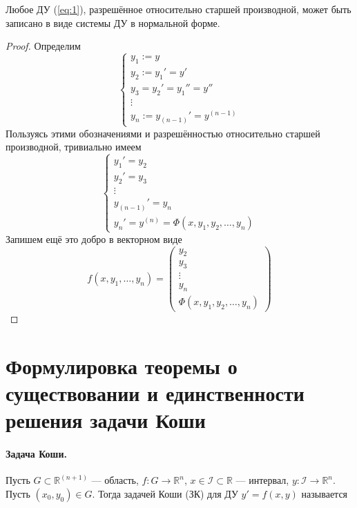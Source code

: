 \documentclass[11pt]{article}
\begin{document}
\begin{remark}
    Любое ДУ (\ref{eq:1}), разрешённое относительно старшей производной, может быть записано в виде системы ДУ в нормальной форме.
\end{remark}

\begin{proof}
    Определим
    \begin{equation*}
        \begin{cases}
            y_1 := y \\
            y_2 := y_1' = y' \\
            y_3 = y_2' = y_1'' = y'' \\
            \vdots \\
            y_n := y_{(n- 1)}' = y^{(n - 1)}
        \end{cases}
    \end{equation*}
    Пользуясь этими обозначениями и разрешённостью относительно старшей производной, тривиально имеем
    \begin{equation*}
        \begin{cases}
            y_1' = y_2 \\
            y_2' = y_3 \\
            \vdots \\
            y_{(n - 1)}' = y_n \\
            y_n' = y^{(n)} = \Phi(x, y_1, y_2, \ldots, y_n)
        \end{cases}
    \end{equation*}
    Запишем ещё это добро в векторном виде
    \[f(x, y_1, \ldots, y_n) = 
    \begin{pmatrix}
        y_2 \\
        y_3 \\
        \vdots \\
        y_n \\
        \Phi(x, y_1, y_2, \ldots, y_n)
    \end{pmatrix}\]
\end{proof}

\section{Формулировка теоремы о существовании и единственности решения задачи Коши}

\paragraph{Задача Коши.} Пусть $G \subset \mathbb{R}^{(n + 1)}$ --- область, $f \colon G \to \mathbb{R}^n$, $x \in \mathcal{I} \subset \mathbb{R}$ --- интервал, $y \colon \mathcal{I} \to \mathbb{R}^n$. Пусть $(x_0, y_0) \in G$. Тогда задачей Коши (ЗК) для ДУ $y' = f(x, y)$ называется
\end{document}
